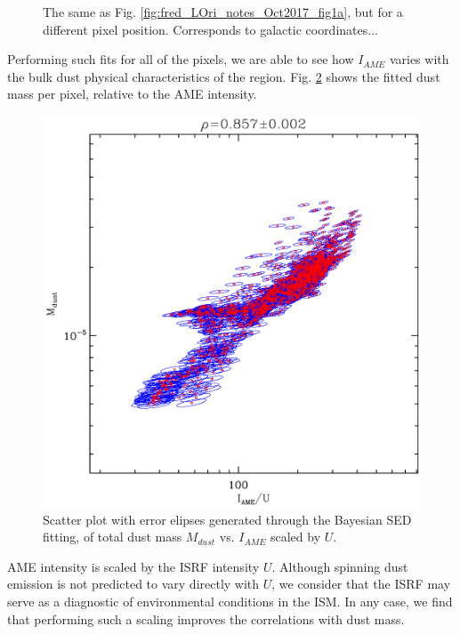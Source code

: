 {\begin{figure}
                \centering
                \caption{The same as Fig. \ref{fig:fred_LOri_notes_Oct2017_fig1a}, but for a different pixel position. Corresponds to galactic coordinates...}
                \label{fig:fred_LOri_notes_Oct2017_fig1b}
              \end{figure}
           Performing such fits for all of the pixels, we are able to see how $I_{AME}$ varies with the bulk dust physical characteristics of the region. Fig. \ref{fig:fred_LOri_notes_Oct2017_fig2a} shows the fitted dust mass per pixel, relative to the AME intensity.

               \begin{figure}
                 \includegraphics[width=\textwidth/2]{../Plots/ch_lori/fred_LOri_notes_Oct2017_fig2a.pdf}
                 \centering
                 \caption{Scatter plot with error elipses generated through the Bayesian SED fitting, of total dust mass $M_{dust}$ vs. $I_{AME}$ scaled by $U$.}
                 \label{fig:fred_LOri_notes_Oct2017_fig2a}
               \end{figure}
               
           AME intensity is scaled by the ISRF intensity $U$. Although spinning dust emission is not predicted to vary directly with $U$, we consider that the ISRF may serve as a diagnostic of environmental conditions in the ISM. In any case, we find that performing such a scaling improves the correlations with dust mass.

}

